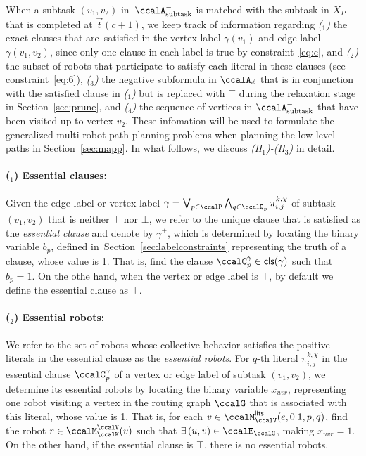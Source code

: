 \documentclass[Afour,sageh,times]{sagej}
\newcounter{mycounter}
\newcommand{\clause}[1]{\mathsf{cls}(#1)}
\newcommand{\auto}[1]{\ccalA_{\textup{#1}}}
\newcommand{\autop}{\ccalA_{\phi}}
\renewcommand{\ap}[3]{\mathcal{\pi}_{{#1},{#2}}^{#3}}
\begin{document}
{{\begin{algorithm}[t]
 \end{algorithm}
 When a subtask $(v_1, v_2)$ in~$\auto{subtask}^-$ is matched with the subtask in $X_P$ that is completed at $\vec{t}(c+1)$, we keep track of information regarding {\it ($_1$)} the exact clauses that are\ satisfied in the vertex label $\gamma(v_1)$  and edge label $\gamma(v_1, v_2)$, since only one clause in each label is true by constraint~\eqref{eq:c}, and {\it ($_2$)} the subset of robots that participate to satisfy each literal in these clauses (see constraint~\eqref{eq:6}),
 {\it ($_3$)} the negative subformula in $\autop$ that is in conjunction  with the satisfied clause in {\it ($_1$)} but is replaced with $\top$ during the relaxation stage in Section~\ref{sec:prune}, and  {\it ($_4$)} the sequence of vertices in $\auto{subtask}^-$ that have been visited up to vertex $v_2$. These infomation will be used to formulate the generalized multi-robot path planning problems when planning the low-level paths in Section~\ref{sec:mapp}. In what follows, we discuss {\it (H$_1$)-(H$_3$)} in detail.

   \paragraph{($_1$) Essential clauses:} Given the edge label or vertex label $\gamma=\bigvee_{p\in \ccalP} \bigwedge_{q\in \ccalQ_p} \ap{i}{j}{k,\chi}$ of subtask $(v_1, v_2)$ that is neither $\top$ nor $\bot$, we refer to the unique clause that is satisfied as the {\it essential clause} and denote by $\gamma^+$, which is determined by locating the binary variable $b_p$, defined in~Section~\ref{sec:labelconstraints} representing the truth of a clause, whose value is 1. That is, find the clause $\ccalC_{p}^{\gamma} \in \clause{\gamma}$ such that $b_p=1$. On the othe hand, when the vertex or edge label is $\top$, by default we define the essential clause as $\top$.
   \paragraph{($_2$) Essential robots:} We refer to the set of robots whose collective behavior satisfies the positive literals in the essential clause as the {\it essential robots}. For $q$-th literal $\ap{i}{j}{k,\chi}$ in the essential clause $\ccalC_p^\gamma$ of a vertex or edge label of subtask $(v_1, v_2)$, we determine its essential robots by locating the binary variable $x_{uvr}$, representing one robot visiting a vertex in the routing graph $\ccalG$ that is associated with this literal, whose value is 1. That is, for each $v\in \ccalM_{\ccalV}^\mathsf{lits} (e, 0|1, p, q)$, find the robot $r\in \ccalM_\ccalK^\ccalV(v)$ such that $\exists\, (u,v)\in\ccalE_\ccalG$, making $x_{uvr}=1$.  On the other hand, if the essential clause is $\top$, there is no essential robots.
}}
\end{document}
